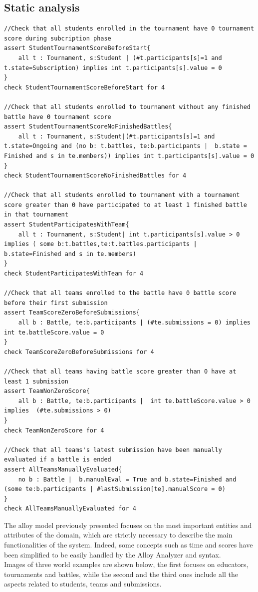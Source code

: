 \subsection{Static analysis}
\begin{lstlisting}[language=alloy]
//Check that all students enrolled in the tournament have 0 tournament score during subcription phase
assert StudentTournamentScoreBeforeStart{
    all t : Tournament, s:Student | (#t.participants[s]=1 and t.state=Subscription) implies int t.participants[s].value = 0
}
check StudentTournamentScoreBeforeStart for 4

//Check that all students enrolled to tournament without any finished battle have 0 tournament score
assert StudentTournamentScoreNoFinishedBattles{
    all t : Tournament, s:Student|(#t.participants[s]=1 and t.state=Ongoing and (no b: t.battles, te:b.participants |  b.state = Finished and s in te.members)) implies int t.participants[s].value = 0
}
check StudentTournamentScoreNoFinishedBattles for 4

//Check that all students enrolled to tournament with a tournament score greater than 0 have participated to at least 1 finished battle in that tournament
assert StudentParticipatesWithTeam{
    all t : Tournament, s:Student| int t.participants[s].value > 0 implies ( some b:t.battles,te:t.battles.participants | b.state=Finished and s in te.members)
}
check StudentParticipatesWithTeam for 4

//Check that all teams enrolled to the battle have 0 battle score before their first submission
assert TeamScoreZeroBeforeSubmissions{
    all b : Battle, te:b.participants | (#te.submissions = 0) implies int te.battleScore.value = 0
}
check TeamScoreZeroBeforeSubmissions for 4

//Check that all teams having battle score greater than 0 have at least 1 submission
assert TeamNonZeroScore{
    all b : Battle, te:b.participants |  int te.battleScore.value > 0  implies  (#te.submissions > 0)
}
check TeamNonZeroScore for 4

//Check that all teams's latest submission have been manually evaluated if a battle is ended
assert AllTeamsManuallyEvaluated{
    no b : Battle |  b.manualEval = True and b.state=Finished and (some te:b.participants | #lastSubmission[te].manualScore = 0)
}
check AllTeamsManuallyEvaluated for 4

\end{lstlisting}
\hfill \break
The alloy model previously presented focuses on the most important entities and attributes of the domain, which are strictly necessary to describe the main functionalities of the system. Indeed, some concepts such as time and scores have been simplified to be easily handled by the Alloy Analyzer and syntax.\\
Images of three world examples are shown below, the first focuses on educators, tournaments and battles, while the second and the third ones include all the aspects related to students, teams and submissions.
\newpage
\thispagestyle{noheader}

